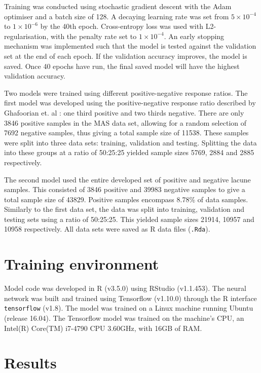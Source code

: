 Training was conducted using stochastic gradient descent with the Adam optimiser and a batch size of 128. A decaying learning rate was set from $5\times10^{-4}$ to $1\times10^{-6}$ by the 40th epoch. Cross-entropy loss was used with L2-regularisation, with the penalty rate set to $1\times10^{-4}$. An early stopping mechanism was implemented such that the model is tested against the validation set at the end of each epoch. If the validation accuracy improves, the model is saved. Once 40 epochs have run, the final saved model will have the highest validation accuracy.

Two models were trained using different positive-negative response ratios. The first model was developed using the positive-negative response ratio described by Ghafoorian et. al \cite{GhafoorianM.2017Dml3}: one third positive and two thirds negative. There are only 3846 positive samples in the MAS data set, allowing for a random selection of 7692 negative samples, thus giving a total sample size of 11538. These samples were split into three data sets: training, validation and testing. Splitting the data into these groups at a ratio of 50:25:25 yielded sample sizes 5769, 2884 and 2885 respectively.

The second model used the entire developed set of positive and negative lacune samples. This consisted of 3846 positive and 39983 negative samples to give a total sample size of 43829. Positive samples encompass 8.78\% of data samples. Similarly to the first data set, the data was split into training, validation and testing sets using a ratio of 50:25:25. This yielded sample sizes 21914, 10957 and 10958 respectively. All data sets were saved as R data files (\texttt{.Rda}).


\section{Training environment}

Model code was developed in R (v3.5.0) using RStudio (v1.1.453). The neural network was built and trained using Tensorflow (v1.10.0) through the R interface \texttt{tensorflow} (v1.8). The model was trained on a Linux machine running Ubuntu (release 16.04). The Tensorflow model was trained on the machine's CPU, an Intel(R) Core(TM) i7-4790 CPU 3.60GHz, with 16GB of RAM. 

\section{Results}

